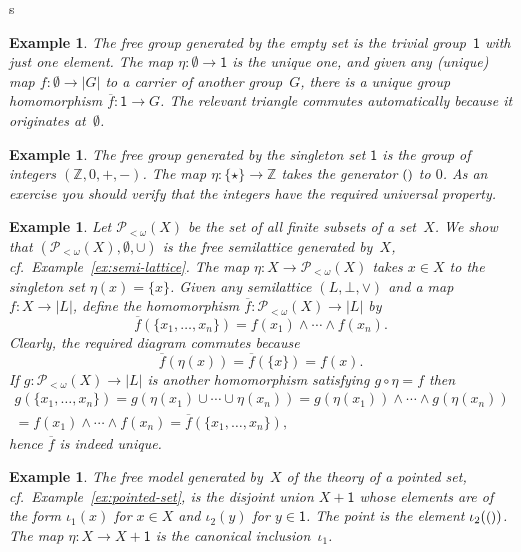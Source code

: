 s\documentclass{amsart}
\newcommand{\ZZ}{\mathbb{Z}} %
\newcommand{\carrier}[1]{|#1|} %
\newcommand{\set}[1]{\{#1\}} %
\newcommand{\finpow}[1]{\mathcal{P}_{{<}\omega}(#1)} %
\newcommand{\one}{\mathsf{1}} %
\newcommand{\unit}{{\text{\small$()$}}} %
\newtheorem{example}[definition]{Example}
\begin{document}
\begin{example}
  The free group generated by the empty set is the trivial group~$\one$ with
  just one element. The map $\eta : \emptyset \to \one$ is the unique one, and
  given any (unique) map $f : \emptyset \to \carrier{G}$ to a carrier of another
  group~$G$, there is a unique group homomorphism $\overline{f} : \one \to G$.
  The relevant triangle commutes automatically because it originates
  at~$\emptyset$.
\end{example}

\begin{example}
  The free group generated by the singleton set $\one$ is the group of integers
  $(\ZZ, 0, {+}, {-})$. The map $\eta : \set{\star} \to \ZZ$ takes the generator
  $\unit$ to $0$. As an exercise you should verify that the integers have the
  required universal property.
\end{example}

\begin{example}
  Let $\finpow{X}$ be the set of all finite subsets of a set~$X$. We show that
  $(\finpow{X}, \emptyset, {\cup})$ is the free semilattice generated by~$X$, cf.\
  Example~\ref{ex:semi-lattice}. The map $\eta : X \to \finpow{X}$ takes $x \in X$ to the
  singleton set $\eta(x) = \set{x}$. Given any semilattice $(L, \bot, {\vee})$ and a map
  $f : X \to \carrier{L}$, define the homomorphism $\overline{f} : \finpow{X} \to \carrier{L}$ by
  \begin{equation*}
    \overline{f}(\set{x_1, \ldots, x_n}) = f(x_1) \wedge \cdots \wedge f(x_n).
  \end{equation*}
  Clearly, the required diagram commutes because
  \begin{equation*}
    \overline{f}(\eta(x)) = \overline{f}(\set{x}) = f(x).
  \end{equation*}
  If $g : \finpow{X} \to \carrier{L}$ is another homomorphism satisfying $g \circ \eta = f$ then
  \begin{multline*}
    g(\set{x_1, \ldots, x_n})
    = g(\eta(x_1) \cup \cdots \cup \eta(x_n))
    = g(\eta(x_1)) \wedge \cdots \wedge g(\eta(x_n)) \\
    = f(x_1) \wedge \cdots \wedge f(x_n)
    = \overline{f}(\set{x_1, \ldots, x_n}),
  \end{multline*}
  hence $\overline{f}$ is indeed unique.
\end{example}

\begin{example}
  The free model generated by~$X$ of the theory of a pointed set, cf.\
  Example~\ref{ex:pointed-set}, is the disjoint union $X + \one$ whose elements are of the
  form $\iota_1(x)$ for $x \in X$ and $\iota_2(y)$ for $y \in \one$. The point is the
  element $\iota_2(\unit)$. The map $\eta : X \to X + \one$ is the canonical
  inclusion~$\iota_1$.
\end{example}
\end{document}
